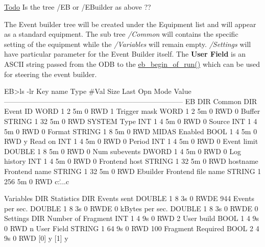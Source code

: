 \begin{Desc}
\item[\hyperlink{todo__todo000002}{Todo}]Is the tree /EB or /EBuilder as above ??\end{Desc}
The Event builder tree will be created under the Equipment list and will appear as a standard equipment. The sub tree {\itshape /Common\/} will contains the specific setting of the equipment while the {\itshape /Variables\/} will remain empty. {\itshape /Settings\/} will have particular parameter for the Event Builder itself. The {\bfseries  User Field } is an ASCII string passed from the ODB to the \hyperlink{mevb_8c_aac338f16c26978fda836e729d5c6e366}{eb\_\-begin\_\-of\_\-run()} which can be used for steering the event builder.


\begin{DoxyCode}
EB>ls -lr
Key name                        Type    #Val  Size  Last Opn Mode Value
---------------------------------------------------------------------------
EB                              DIR
    Common                      DIR
        Event ID                WORD    1     2     5m   0   RWD  1
        Trigger mask            WORD    1     2     5m   0   RWD  0
        Buffer                  STRING  1     32    5m   0   RWD  SYSTEM
        Type                    INT     1     4     5m   0   RWD  0
        Source                  INT     1     4     5m   0   RWD  0
        Format                  STRING  1     8     5m   0   RWD  MIDAS
        Enabled                 BOOL    1     4     5m   0   RWD  y
        Read on                 INT     1     4     5m   0   RWD  0
        Period                  INT     1     4     5m   0   RWD  0
        Event limit             DOUBLE  1     8     5m   0   RWD  0
        Num subevents           DWORD   1     4     5m   0   RWD  0
        Log history             INT     1     4     5m   0   RWD  0
        Frontend host           STRING  1     32    5m   0   RWD  hostname
        Frontend name           STRING  1     32    5m   0   RWD  Ebuilder
        Frontend file name      STRING  1     256   5m   0   RWD  c:\...\ebuser.c
      
    Variables                   DIR
    Statistics                  DIR
        Events sent             DOUBLE  1     8     3s   0   RWDE 944
        Events per sec.         DOUBLE  1     8     3s   0   RWDE 0
        kBytes per sec.         DOUBLE  1     8     3s   0   RWDE 0
    Settings                    DIR
        Number of Fragment      INT     1     4     9s   0   RWD  2
        User build              BOOL    1     4     9s   0   RWD  n
        User Field              STRING  1     64    9s   0   RWD  100
        Fragment Required       BOOL    2     4     9s   0   RWD
                                        [0]             y
                                        [1]             y
\end{DoxyCode}
